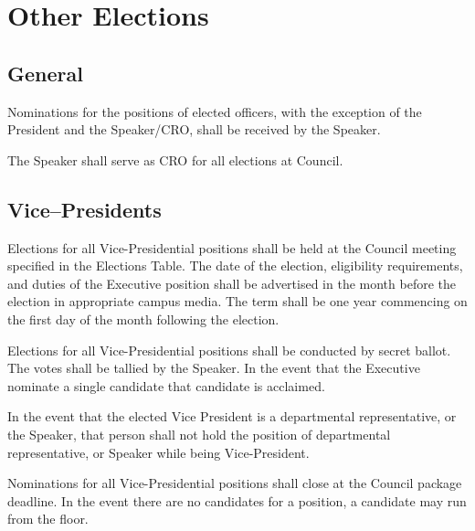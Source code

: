 \newpage

\section{Other Elections}
\subsection{General}

\begin{longenum}[ label*=\thesubsection.\arabic*., align=left]
	\item Nominations for the positions of elected officers, with the exception of the President and the Speaker/CRO, shall be received by the Speaker. 
 	\item The Speaker shall serve as CRO for all elections at Council.
\end{longenum}

\subsection{Vice--Presidents}
\begin{longenum}[ label*=\thesubsection.\arabic*., align=left]
	\item Elections for all Vice-Presidential positions shall be held at the Council meeting specified in the Elections Table. The date of the election, eligibility requirements, and duties of the Executive position shall be advertised in the month before the election in appropriate campus media. The term shall be one year commencing on the first day of the month following the election. 
	\item Elections for all Vice-Presidential positions shall be conducted by secret ballot. The votes shall be tallied by the Speaker. In the event that the Executive nominate a single candidate that candidate is acclaimed.
	\item In the event that the elected Vice President is a departmental representative, or the Speaker, that person shall not hold the position of departmental representative, or Speaker while being Vice-President. 
	\item Nominations for all Vice-Presidential positions shall close at the Council package deadline. In the event there are no candidates for a position, a candidate may run from the floor.
\end{longenum}

